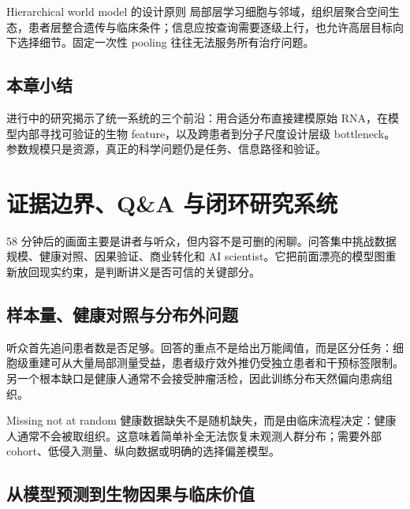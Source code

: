 \documentclass[a4paper]{article}
\begin{document}
\begin{importantbox}{Hierarchical world model 的设计原则}
局部层学习细胞与邻域，组织层聚合空间生态，患者层整合遗传与临床条件；信息应按查询需要逐级上行，也允许高层目标向下选择细节。固定一次性 pooling 往往无法服务所有治疗问题。
\end{importantbox}

\subsection{本章小结}

进行中的研究揭示了统一系统的三个前沿：用合适分布直接建模原始 RNA，在模型内部寻找可验证的生物 feature，以及跨患者到分子尺度设计层级 bottleneck。参数规模只是资源，真正的科学问题仍是任务、信息路径和验证。

\section{证据边界、Q\&A 与闭环研究系统}

58 分钟后的画面主要是讲者与听众，但内容不是可删的闲聊。问答集中挑战数据规模、健康对照、因果验证、商业转化和 AI scientist。它把前面漂亮的模型图重新放回现实约束，是判断讲义是否可信的关键部分。

\subsection{样本量、健康对照与分布外问题}

听众首先追问患者数是否足够。回答的重点不是给出万能阈值，而是区分任务：细胞级重建可从大量局部测量受益，患者级疗效外推仍受独立患者和干预标签限制。另一个根本缺口是健康人通常不会接受肿瘤活检，因此训练分布天然偏向患病组织。


\begin{warningbox}{Missing not at random}
健康数据缺失不是随机缺失，而是由临床流程决定：健康人通常不会被取组织。这意味着简单补全无法恢复未观测人群分布；需要外部 cohort、低侵入测量、纵向数据或明确的选择偏差模型。
\end{warningbox}

\subsection{从模型预测到生物因果与临床价值}
\end{document}
